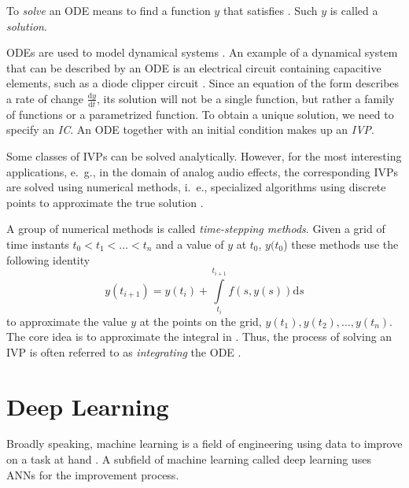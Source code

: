 To \emph{solve} an \ac{ODE} means to find a function $y$ that satisfies . Such $y$ is called a \emph{solution}.

\acp{ODE} are used to model dynamical systems \cite{Karlsson2019}. An example of a dynamical system that can be described by an \ac{ODE} is an electrical circuit containing capacitive elements, such as a diode clipper circuit \cite{Yeh2007}. %
Since an equation of the form  describes a rate of change $\frac{\mathrm{d} y}{\mathrm{d} t}$, its solution will not be a single function, but rather a family of functions or a parametrized function. To obtain a unique solution, we need to specify an \emph{\ac{IC}}. An \ac{ODE} together with an initial condition makes up an \emph{\ac{IVP}}.

Some classes of \acp{IVP} can be solved analytically. However, for the most interesting applications, e.\ g., in the domain of analog audio effects, the corresponding \acp{IVP} are solved using numerical methods, i.\ e., specialized algorithms using discrete points to approximate the true solution \cite{Gockenbach2011}. 

A group of numerical methods is called \emph{time-stepping methods}. Given a grid of time instants $t_0 < t_1 < \dots < t_n$ and a value of $y$ at $t_0$, $y(t_0$) these methods use the following identity
\begin{equation}
  y(t_{i+1}) = y(t_{i}) + \int \limits_{t_i}^{t_{i+1}} f(s, y(s)) \mathrm{d} s
  \label{eq:time_stepping_identity}
\end{equation}
to approximate the value $y$ at the points on the grid, $y(t_1), y(t_2), \dots, y(t_n)$. The core idea is to approximate the integral in . Thus, the process of solving an \ac{IVP} is often referred to as \emph{integrating} the \ac{ODE} \cite{Gockenbach2011}.

\section{Deep Learning}
\label{section:deep_learning}

Broadly speaking, machine learning is a field of engineering using data to improve on a task at hand \cite{Goodfellow-et-al-2016}. A subfield of machine learning called deep learning uses \acp{ANN} for the improvement process. 

